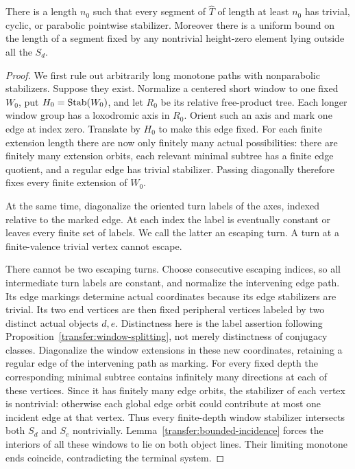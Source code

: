 \begin{proposition}\label{transfer:terminal-paths}
There is a length \(n_0\) such that every segment of \(\widehat T\) of length at least \(n_0\) has trivial, cyclic, or parabolic pointwise stabilizer. Moreover there is a uniform bound on the length of a segment fixed by any nontrivial height-zero element lying outside all the \(S_d\).
\end{proposition}
\begin{proof}
We first rule out arbitrarily long monotone paths with nonparabolic stabilizers. Suppose they exist. Normalize a centered short window to one fixed \(W_0\), put \(H_0=\operatorname{Stab}(W_0)\), and let \(R_0\) be its relative free-product tree. Each longer window group has a loxodromic axis in \(R_0\). Orient such an axis and mark one edge at index zero. Translate by \(H_0\) to make this edge fixed. For each finite extension length there are now only finitely many actual possibilities: there are finitely many extension orbits, each relevant minimal subtree has a finite edge quotient, and a regular edge has trivial stabilizer. Passing diagonally therefore fixes every finite extension of \(W_0\).

At the same time, diagonalize the oriented turn labels of the axes, indexed relative to the marked edge. At each index the label is eventually constant or leaves every finite set of labels. We call the latter an escaping turn. A turn at a finite-valence trivial vertex cannot escape.

There cannot be two escaping turns. Choose consecutive escaping indices, so all intermediate turn labels are constant, and normalize the intervening edge path. Its edge markings determine actual coordinates because its edge stabilizers are trivial. Its two end vertices are then fixed peripheral vertices labeled by two distinct actual objects \(d,e\). Distinctness here is the label assertion following Proposition~\ref{transfer:window-splitting}, not merely distinctness of conjugacy classes. Diagonalize the window extensions in these new coordinates, retaining a regular edge of the intervening path as marking. For every fixed depth the corresponding minimal subtree contains infinitely many directions at each of these vertices. Since it has finitely many edge orbits, the stabilizer of each vertex is nontrivial: otherwise each global edge orbit could contribute at most one incident edge at that vertex. Thus every finite-depth window stabilizer intersects both \(S_d\) and \(S_e\) nontrivially. Lemma~\ref{transfer:bounded-incidence} forces the interiors of all these windows to lie on both object lines. Their limiting monotone ends coincide, contradicting the terminal system.


\end{proof}
